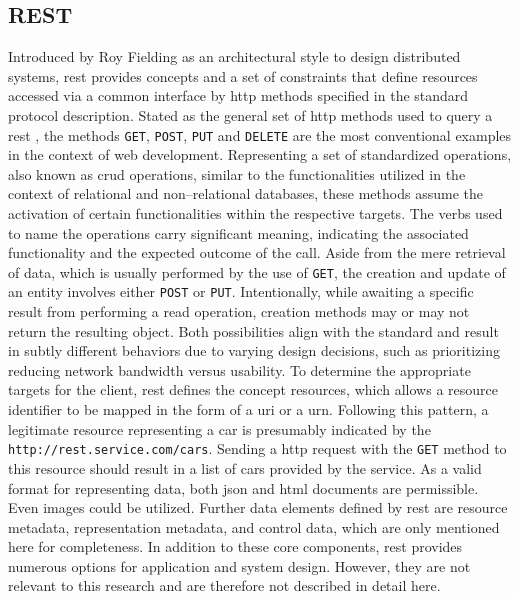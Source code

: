 \subsection{REST}
\label{ch:Fundamentals:sec:Data Exchange:ssec:REST}

Introduced by Roy Fielding as an architectural style \cite{patni_pro_2017} to design distributed systems, \acrfull{rest} provides concepts and a set of constraints that define resources accessed via a common interface by \acrshort{http} methods specified in the standard protocol description.
Stated as the general set of \acrshort{http} methods used to query a \acrshort{rest} , the methods \verb|GET|, \verb|POST|, \verb|PUT| and \verb|DELETE| are the most conventional examples in the context of web development. 
Representing a set of standardized operations, also known as \acrshort{crud} operations, similar to the functionalities utilized in the context of relational and non--relational databases, these methods assume the activation of certain functionalities within the respective targets.
The verbs used to name the operations carry significant meaning, indicating the associated functionality and the expected outcome of the call.
Aside from the mere retrieval of data, which is usually performed by the use of \verb|GET|, the creation and update of an entity involves either \verb|POST| or \verb|PUT|.
Intentionally, while awaiting a specific result from performing a read operation, creation methods may or may not return the resulting object. Both possibilities align with the standard and result in subtly different behaviors due to varying design decisions, such as prioritizing reducing network bandwidth versus usability.
To determine the appropriate targets for the client, \acrshort{rest} defines the concept resources, which allows a resource identifier to be mapped in the form of a \acrshort{uri} or a \acrshort{urn}. Following this pattern, a legitimate resource representing a car is presumably indicated by the  \verb|http://rest.service.com/cars|. 
Sending a \acrshort{http} request with the \verb|GET| method to this resource should result in a list of cars provided by the service. As a valid format for representing data, both \acrshort{json} and \acrshort{html} documents are permissible. Even images could be utilized.
Further data elements defined by \acrshort{rest} are resource metadata, representation metadata, and control data, which are only mentioned here for completeness. 
In addition to these core components, \acrshort{rest} provides numerous options for application and system design. However, they are not relevant to this research and are therefore not described in detail here.

